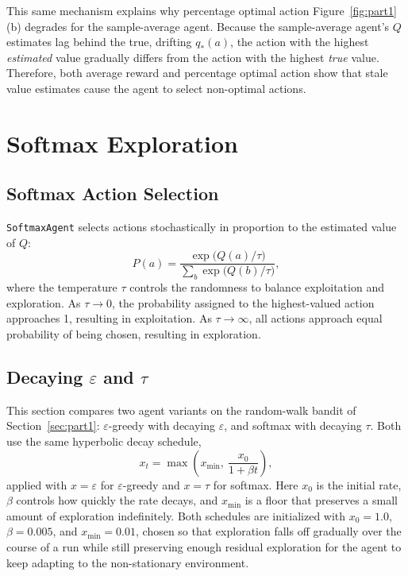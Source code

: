 \documentclass{article}
\begin{document}
This same mechanism explains why percentage optimal action
Figure~\ref{fig:part1}(b) degrades for the sample-average agent. Because the
sample-average agent's $Q$ estimates lag behind the true, drifting $q_*(a)$, the
action with the highest \emph{estimated} value gradually differs from the action
with the highest \emph{true} value. Therefore, both average reward and
percentage optimal action show that stale value estimates cause the agent to
select non-optimal actions.

\section{Softmax Exploration}
\label{sec:part2}

\subsection{Softmax Action Selection}
\texttt{SoftmaxAgent} selects actions stochastically in proportion to the
estimated value of $Q$:
\begin{equation}
    P(a) = \frac{\exp\!\big(Q(a)/\tau\big)}{\sum_{b} \exp\!\big(Q(b)/\tau\big)},
    \label{eq:softmax}
\end{equation}
where the temperature $\tau$ controls the randomness to balance exploitation and
exploration. As $\tau \to 0$, the probability assigned to the highest-valued
action approaches 1, resulting in exploitation. As $\tau \to \infty$, all
actions approach equal probability of being chosen, resulting in exploration.

\subsection{Decaying $\varepsilon$ and $\tau$}
This section compares two agent variants on the random-walk bandit of
Section~\ref{sec:part1}: $\varepsilon$-greedy with decaying $\varepsilon$, and
softmax with decaying $\tau$. Both use the same hyperbolic decay schedule,
\begin{equation}
    x_t = \max\!\left(x_{\min},\
    \frac{x_0}{1 + \beta t}\right),
    \label{eq:decay-schedule}
\end{equation}
applied with $x = \varepsilon$ for $\varepsilon$-greedy and $x = \tau$ for
softmax. Here $x_0$ is the initial rate, $\beta$ controls how quickly the rate
decays, and $x_{\min}$ is a floor that preserves a small amount of exploration
indefinitely. Both schedules are initialized with $x_0 = 1.0$, $\beta = 0.005$,
and $x_{\min} = 0.01$, chosen so that exploration falls off gradually over the
course of a run while still preserving enough residual exploration for the agent
to keep adapting to the non-stationary environment.
\end{document}

